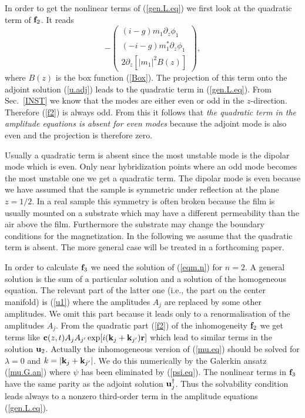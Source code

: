 In order to get the nonlinear terms of (\ref{gen.L.eq}) we first look
at the quadratic term of ${\bf f}_2$. It reads
\begin{equation}
   -\left(\begin{array}{c}
   (i-g)m_1\partial_z\phi_1\\(-i-g)m_1^*\partial_z\phi_1\\
   2\partial_z[|m_1|^2B(z)]\end{array}\right),
  \label{f2}
\end{equation}
where $B(z)$ is the box function (\ref{Box}).  The projection of this
term onto the adjoint solution (\ref{u.adj}) leads to the quadratic
term in (\ref{gen.L.eq}). From Sec.~\ref{INST} we know that the modes
are either even or odd in the $z$-direction.  Therefore (\ref{f2}) is
always odd. From this it follows that {\em the quadratic term in the
amplitude equations is absent for even modes\/} because the adjoint
mode is also even and the projection is therefore zero. 

Usually a quadratic term is absent since the most unstable mode is
the dipolar mode which is even. Only near hybridization points where
an odd mode becomes the most unstable one we get a quadratic term.
The dipolar mode is even because we have assumed that the sample is
symmetric under reflection at the plane $z=1/2$. In a real sample
this symmetry is often broken because the film is usually mounted on
a substrate which may have a different permeability than the air
above the film. Furthermore the substrate may change the boundary
conditions for the magnetization. In the following we assume
that the quadratic term is absent. The more general case will be
treated in a forthcoming paper.

In order to calculate ${\bf f}_3$ we need the solution of
(\ref{eqm.n}) for $n=2$. A general solution is the sum of a
particular solution and a solution of the homogeneous equation.
The relevant part of the latter one
(i.e., the part on the center manifold) is 
(\ref{u1}) where the amplitudes $A_j$ are replaced by some other
amplitudes. We omit this part because it leads only to a
renormalisation of the amplitudes $A_j$. From the quadratic part
(\ref{f2}) of the inhomogeneity ${\bf f}_2$ we get terms like ${\bf
c}(z,t)A_jA_{j'}\exp[i({\bf k}_j+{\bf k}_{j'}){\bf r}]$ which lead to 
similar terms in the solution ${\bf u}_2$. Actually the
inhomogeneous version of (\ref{mu.eq}) should be solved for
$\lambda=0$ and $k=|{\bf k}_j+ {\bf k}_{j'}|$. We do this numerically
by the Galerkin ansatz (\ref{mu.G.an}) where $\psi$ has been
eliminated by (\ref{psi.eq}). The nonlinear terms in ${\bf f}_3$ have
the same parity as the adjoint solution ${\bf u}_j^\dagger$. Thus the
solvability condition leads always to a nonzero third-order term in
the amplitude equations (\ref{gen.L.eq}).


